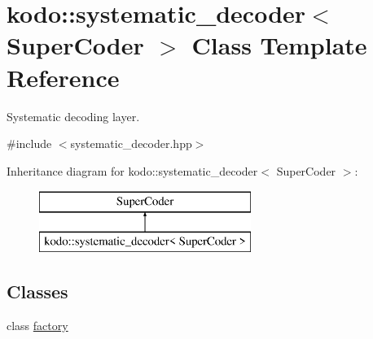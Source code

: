 \hypertarget{classkodo_1_1systematic__decoder}{\section{kodo\-:\-:systematic\-\_\-decoder$<$ Super\-Coder $>$ Class Template Reference}
\label{classkodo_1_1systematic__decoder}
}


Systematic decoding layer.  




{\ttfamily \#include $<$systematic\-\_\-decoder.\-hpp$>$}

Inheritance diagram for kodo\-:\-:systematic\-\_\-decoder$<$ Super\-Coder $>$\-:\begin{figure}[H]
\begin{center}
\leavevmode
\includegraphics[height=2.000000cm]{classkodo_1_1systematic__decoder}
\end{center}
\end{figure}
\subsection*{Classes}
\begin{DoxyCompactItemize}
\item 
class \hyperlink{classkodo_1_1systematic__decoder_1_1factory}{factory}
\end{DoxyCompactItemize}
